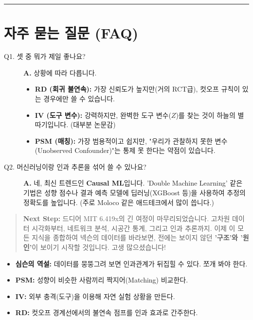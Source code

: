 \documentclass[11pt,a4paper]{book}
\theoremstyle{definition}
\begin{document}
\vspace{0.5cm}\hrule\vspace{0.5cm}

\section{자주 묻는 질문 (FAQ)}

\begin{description}
    \item[Q1. 셋 중 뭐가 제일 좋나요?]
    \textbf{A.} 상황에 따라 다릅니다.
    \begin{itemize}
        \item \textbf{RD (회귀 불연속):} 가장 신뢰도가 높지만(거의 RCT급), 컷오프 규칙이 있는 경우에만 쓸 수 있습니다.
        \item \textbf{IV (도구 변수):} 강력하지만, 완벽한 도구 변수($Z$)를 찾는 것이 하늘의 별 따기입니다. (대부분 논문감)
        \item \textbf{PSM (매칭):} 가장 범용적이고 쉽지만, "우리가 관찰하지 못한 변수(Unobserved Confounder)"는 통제 못 한다는 약점이 있습니다.
    \end{itemize}
    
    \item[Q2. 머신러닝이랑 인과 추론을 섞어 쓸 수 있나요?]
    \textbf{A.} 네, 최신 트렌드인 \textbf{Causal ML}입니다. 'Double Machine Learning' 같은 기법은 성향 점수나 결과 예측 모델에 딥러닝(XGBoost 등)을 사용하여 추정의 정확도를 높입니다. (주로 Moloco 같은 애드테크에서 많이 씁니다.)
\end{description}

\vspace{1cm}
\begin{quote}
\textbf{Next Step:} 드디어 MIT 6.419x의 긴 여정이 마무리되었습니다. 고차원 데이터 시각화부터, 네트워크 분석, 시공간 통계, 그리고 인과 추론까지. 이제 이 모든 지식을 종합하여 넥슨의 데이터를 바라보면, 전에는 보이지 않던 \textbf{'구조'와 '원인'}이 보이기 시작할 것입니다. 고생 많으셨습니다!
\end{quote}

\begin{summarybox}[title={Module 4 (Part B) 핵심 요약}]
\begin{itemize}
    \item \textbf{심슨의 역설:} 데이터를 뭉뚱그려 보면 인과관계가 뒤집힐 수 있다. 쪼개 봐야 한다.
    \item \textbf{PSM:} 성향이 비슷한 사람끼리 짝지어(Matching) 비교한다.
    \item \textbf{IV:} 외부 충격(도구)을 이용해 자연 실험 상황을 만든다.
    \item \textbf{RD:} 컷오프 경계선에서의 불연속 점프를 인과 효과로 간주한다.
\end{itemize}
\end{summarybox}
\end{document}
